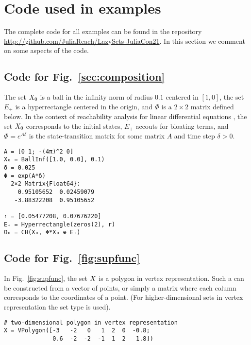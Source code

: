 \section{Code used in examples} \label{sec:code_examples}

The complete code for all examples can be found in the repository \url{http://github.com/JuliaReach/LazySets-JuliaCon21}. In this section we comment on some aspects of the code.


\subsection{Code for Fig.~\ref{sec:composition}} \label{sec:omega0}

The set $X_0$ is a ball in the infinity norm of radius $0.1$ centered in $[1, 0]$, the set $E_+$ is a hyperrectangle centered in the origin, and $\Phi$ is a $2 \times 2$ matrix defined below.
%
In the context of reachability analysis for linear differential equations \cite{BogomolovFFVPS18}, the set $X_0$ corresponds to the initial states, $E_+$ accouts for bloating terms, and $\Phi = e^{A\delta}$ is the state-transition matrix for some matrix $A$ and time step $\delta > 0$.

\begin{minipage}{\linewidth}
\begin{lstlisting}
A = [0 1; -(4π)^2 0]
X₀ = BallInf([1.0, 0.0], 0.1)
δ = 0.025
Φ = exp(A*δ)
  2×2 Matrix{Float64}:
    0.95105652  0.02459079
   -3.88322208  0.95105652

r = [0.05477208, 0.07676220]
E₊ = Hyperrectangle(zeros(2), r)
Ω₀ = CH(X₀, Φ*X₀ ⊕ E₊)
\end{lstlisting}
\end{minipage}

\subsection{Code for Fig.~\ref{fig:supfunc}}

In Fig.~\ref{fig:supfunc}, the set $X$ is a polygon in vertex representation. Such a  can be constructed from a vector of points, or simply a matrix where each column corresponds to the coordinates of a point. (For higher-dimensional sets in vertex representation the set type  is used).

\begin{minipage}{\linewidth}
\begin{lstlisting}
# two-dimensional polygon in vertex representation
X = VPolygon([-3   -2   0   1  2  0  -0.8;
              0.6  -2  -2  -1  1  2   1.8])
\end{lstlisting}
\end{minipage}

